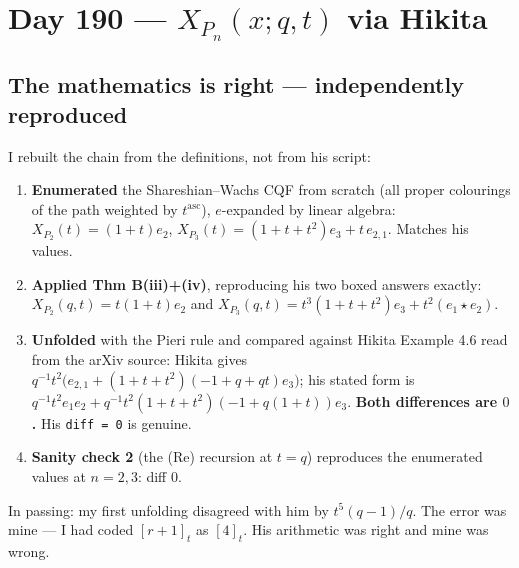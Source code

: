 \documentclass[11pt,a4paper]{article}
\newcommand{\rr}[1]{\texttt{#1}}
\begin{document}
\section{Day 190 --- $X_{P_n}(x;q,t)$ via Hikita}

\subsection{The mathematics is right --- independently reproduced}
I rebuilt the chain from the definitions, not from his script:
\begin{enumerate}
\item \textbf{Enumerated} the Shareshian--Wachs CQF from scratch (all proper colourings of
the path weighted by $t^{\mathrm{asc}}$), $e$-expanded by linear algebra:
$X_{P_2}(t)=(1+t)e_2$, $X_{P_3}(t)=(1+t+t^2)e_3+t\,e_{2,1}$. Matches his values.
\item \textbf{Applied Thm B(iii)+(iv)}, reproducing his two boxed answers exactly:
$X_{P_2}(q,t)=t(1+t)e_2$ and $X_{P_3}(q,t)=t^3(1+t+t^2)e_3+t^2(e_1\star e_2)$.
\item \textbf{Unfolded} with the Pieri rule and compared against Hikita Example 4.6 read
from the arXiv source: Hikita gives $q^{-1}t^2\bigl(e_{2,1}+(1+t+t^2)(-1+q+qt)e_3\bigr)$;
his stated form is $q^{-1}t^2e_1e_2+q^{-1}t^2(1+t+t^2)(-1+q(1+t))e_3$.
\textbf{Both differences are $0$.} His \rr{diff = 0} is genuine.
\item \textbf{Sanity check 2} (the (Re) recursion at $t=q$) reproduces the enumerated
values at $n=2,3$: diff $0$.
\end{enumerate}
In passing: my first unfolding disagreed with him by $t^5(q-1)/q$. The error was mine ---
I had coded $[r+1]_t$ as $[4]_t$. His arithmetic was right and mine was wrong.
\end{document}
